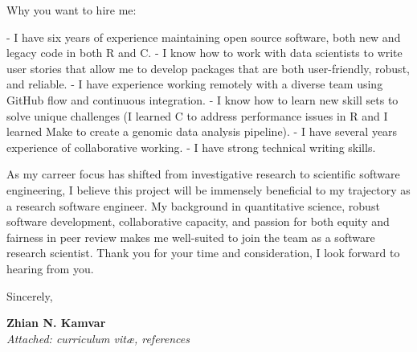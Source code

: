 
Why you want to hire me:

 - I have six years of experience maintaining open source software, both new and
   legacy code in both R and C.
 - I know how to work with data scientists to write user stories that allow me
   to develop packages that are both user-friendly, robust, and reliable.
 - I have experience working remotely with a diverse team using GitHub flow and 
   continuous integration.
 - I know how to learn new skill sets to solve unique challenges (I learned C
   to address performance issues in R and I learned Make to create a genomic
   data analysis pipeline).
 - I have several years experience of collaborative working.
 - I have strong technical writing skills.


\vspace{1ex}

As my carreer focus has shifted from investigative research to scientific
software engineering, I believe this project will be immensely beneficial to my
trajectory as a research software engineer. My background in quantitative
science, robust software development, collaborative capacity, and passion for
both equity and fairness in peer review makes me well-suited to join the team
as a software research scientist. Thank you for your time and consideration, I
look forward to hearing from you. 

\vspace{2ex}

Sincerely,

\vspace{5ex}

\textbf{Zhian N. Kamvar}\\
\textit{Attached: curriculum vit\ae{}, references}
\clearpage




